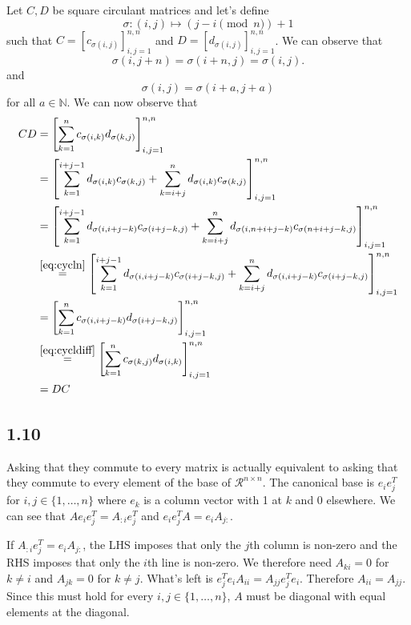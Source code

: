 \begin{solution}
  Let $C,D$ be square circulant matrices and let's define
  \[ \sigma : (i,j) \mapsto (j - i \pmod{n})+1 \]
  such that
  $C = [c_{\sigma(i,j)}]_{i,j=1}^{n,n}$ and
  $D = [d_{\sigma(i,j)}]_{i,j=1}^{n,n}$.
  We can observe that
  \begin{equation}
    \label{eq:cycln}
    \sigma(i,j+n) = \sigma(i+n,j) = \sigma(i,j).
  \end{equation}
  and
  \begin{equation}
    \label{eq:cycldiff}
    \sigma(i,j) = \sigma(i+a,j+a)
  \end{equation}
  for all $a \in \mathbb{N}$.
  We can now observe that
  \begin{align*}
    CD
    & =
    \left[
      \sum_{k=1}^n
      c_{\sigma(i,k)}d_{\sigma(k,j)}
    \right]_{i,j=1}^{n,n}\\
    & =
    \left[
      \sum_{k=1}^{i+j-1}
      d_{\sigma(i,k)}c_{\sigma(k,j)}
      +
      \sum_{k=i+j}^{n}
      d_{\sigma(i,k)}c_{\sigma(k,j)}
    \right]_{i,j=1}^{n,n}\\
    & =
    \left[
      \sum_{k=1}^{i+j-1}
      d_{\sigma(i,i+j-k)}c_{\sigma(i+j-k,j)}
      +
      \sum_{k=i+j}^{n}
      d_{\sigma(i,n+i+j-k)}c_{\sigma(n+i+j-k,j)}
    \right]_{i,j=1}^{n,n}\\
    & \stackrel{\eqref{eq:cycln}}{=}
    \left[
      \sum_{k=1}^{i+j-1}
      d_{\sigma(i,i+j-k)}c_{\sigma(i+j-k,j)}
      +
      \sum_{k=i+j}^{n}
      d_{\sigma(i,i+j-k)}c_{\sigma(i+j-k,j)}
    \right]_{i,j=1}^{n,n}\\
    & =
    \left[
      \sum_{k=1}^n
      c_{\sigma(i,i+j-k)}d_{\sigma(i+j-k,j)}
    \right]_{i,j=1}^{n,n}\\
    & \stackrel{\eqref{eq:cycldiff}}{=}
    \left[
      \sum_{k=1}^n
      c_{\sigma(k,j)}d_{\sigma(i,k)}
    \right]_{i,j=1}^{n,n}\\
    & = DC
  \end{align*}
\end{solution}

\subsection*{1.10}
\begin{solution}
  Asking that they commute to every matrix is actually equivalent to asking
  that they commute to every element of the base of $\mathcal{R}^{n \times n}$.
  The canonical base is $e_ie_j^T$ for $i,j \in \{1, \ldots, n\}$ where
  $e_k$ is a column vector with 1 at $k$ and 0 elsewhere.
  We can see that $Ae_ie_j^T = A_{:i}e_j^T$ and $e_ie_j^TA = e_iA_{j:}$.

  If $A_{:i}e_j^T = e_iA_{j:}$, the LHS imposes that only the $j$th column is non-zero
  and the RHS imposes that only the $i$th line is non-zero.
  We therefore need $A_{ki} = 0$ for $k \neq i$ and $A_{jk} = 0$ for $k \neq j$.
  What's left is $e_j^Te_iA_{ii} = A_{jj}e_j^Te_i$.
  Therefore $A_{ii} = A_{jj}$.
  Since this must hold for every $i,j \in \{1, \ldots, n\}$, $A$ must be diagonal
  with equal elements at the diagonal.
\end{solution}

